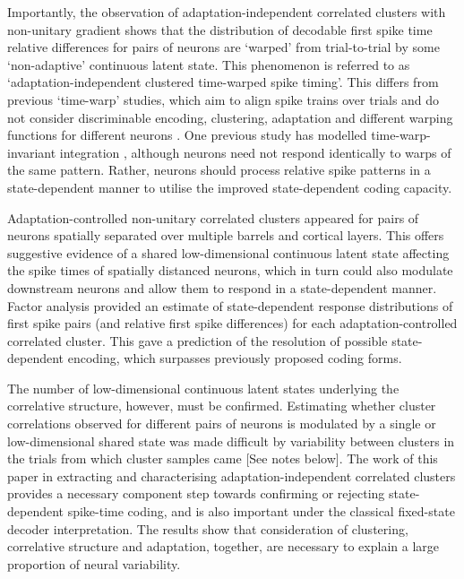 \documentclass{article}
\begin{document}
Importantly, the observation of adaptation-independent correlated clusters with non-unitary gradient shows that the distribution of decodable first spike time relative differences for pairs of neurons are `warped' from trial-to-trial by some `non-adaptive' continuous latent state. This phenomenon is referred to as `adaptation-independent clustered time-warped spike timing'. This differs from previous `time-warp' studies, which aim to align spike trains over trials and do not consider discriminable encoding, clustering, adaptation and different warping functions for different neurons \cite{williams2020discovering}. One previous study has modelled time-warp-invariant integration \cite{gutig2009time}, although neurons need not respond identically to warps of the same pattern. Rather, neurons should process relative spike patterns in a state-dependent manner to utilise the improved state-dependent coding capacity.

Adaptation-controlled non-unitary correlated clusters appeared for pairs of neurons spatially separated over multiple barrels and cortical layers. This offers suggestive evidence of a shared low-dimensional continuous latent state affecting the spike times of spatially distanced neurons, which in turn could also modulate downstream neurons and allow them to respond in a state-dependent manner. Factor analysis provided an estimate of state-dependent response distributions of first spike pairs (and relative first spike differences) for each adaptation-controlled correlated cluster. This gave a prediction of the resolution of possible state-dependent encoding, which surpasses previously proposed coding forms. 

The number of low-dimensional continuous latent states underlying the correlative structure, however, must be confirmed. Estimating whether cluster correlations observed for different pairs of neurons is modulated by a single or low-dimensional shared state was made difficult by variability between clusters in the trials from which cluster samples came [See notes below]. The work of this paper in extracting and characterising adaptation-independent correlated clusters provides a necessary component step towards confirming or rejecting state-dependent spike-time coding, and is also important under the classical fixed-state decoder interpretation. The results show that consideration of clustering, correlative structure and adaptation, together, are necessary to explain a large proportion of neural variability.
\end{document}
